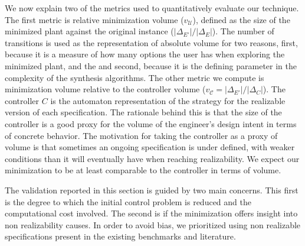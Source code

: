 We now explain two of the metrics used to quantitatively evaluate our technique. The first metric is relative minimization volume ($v_{\mathcal{U}}$), defined as the size of the minimized plant against the original instance ($|\Delta_{E'}|/|\Delta_{E}|$). 
The number of transitions is used as the representation of absolute volume for two reasons, first, because it is a measure of how many options the user has when exploring the minimized plant, and the  and second, because it is the defining parameter in the complexity of the synthesis algorithms. 
The other metric we compute is minimization volume relative to the controller volume ($v_{\mathcal{C}}=|\Delta_{E'}|/|\Delta_{C}|$). The controller $C$ is the automaton representation of the strategy for the realizable version of each specification. The rationale behind this is that the size of the controller is a good proxy for the volume of the engineer's design intent in terms of concrete behavior. The motivation for taking the controller as a proxy of volume is that sometimes an ongoing specification is under defined, with weaker conditions than it will eventually have when reaching realizability. We expect our minimization to be at least comparable to the controller in terms of volume.

The validation reported in this section is guided by two main concerns.  This first is the degree to which the initial control problem is reduced and the computational cost involved. The second is if the minimization offers insight into non realizability causes.
In order to avoid bias, we prioritized using non realizable specifications present in the existing benchmarks and literature.


